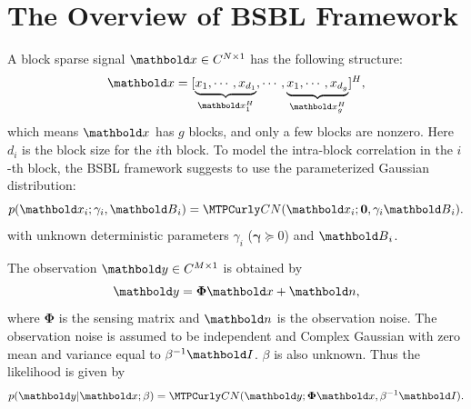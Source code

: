 %
\section{The Overview of BSBL Framework}
A block sparse signal $\ve{x}\in\mathbb{C}^{N\times1}$ has the following structure:
\begin{equation}
\ve{x} = [\underbrace{x_1,\cdots,x_{d_1}}_{\ve{x}_1^H},\cdots,
\underbrace{x_1,\cdots,x_{d_g}}_{\ve{x}_g^H}]^H,
\end{equation}
which means $\ve{x}$ has $g$ blocks, and only a few blocks are nonzero. Here $d_i$ is the block size for the $i$th block. To model the intra-block correlation in the $i$-th block, the BSBL framework suggests to use the parameterized Gaussian distribution:
\begin{equation}\label{eq:x_model}
p(\ve{x}_i;{\gamma_i},\ve{B}_i) =
\mathcal{CN}(\ve{x}_i;\mathbf{0},{\gamma_i}\ve{B}_i). 
\end{equation}
with unknown deterministic parameters $\gamma_i$ ($\bm{\gamma}\succeq0$) and $\ve{B}_i$. 

The observation $\ve{y}\in\mathbb{C}^{M\times1}$ is obtained by
\begin{equation}
\ve{y} = \bm{\Phi}\ve{x} + \ve{n},
\end{equation}
where $\bm{\Phi}$ is the sensing matrix and $\ve{n}$ is the observation noise.
The observation noise is assumed to be independent and Complex Gaussian with zero 
mean and variance equal to $\beta^{-1}\ve{I}$. $\beta$ is also unknown. Thus the likelihood is given by
\begin{equation}\label{eq:y_model}
p(\ve{y}|\ve{x};\beta) = \mathcal{CN}(\ve{y};\bm{\Phi}\ve{x},\beta^{-1}\ve{I}). 
\end{equation}

